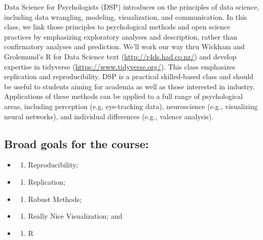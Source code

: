 Data Science for Psychologists (DSP) introduces on the principles of data science, including data wrangling, modeling, visualization, and communication. In this class, we link those principles to psychological methods and open science practices by emphasizing exploratory analyses and description, rather than confirmatory analyses and prediction. We'll work our way thru Wickham and Grolemund's R for Data Science text (\url{http://r4ds.had.co.nz/}) and develop expertise in tidyverse (\url{https://www.tidyverse.org/}). This class emphasizes replication and reproducibility. DSP is a practical skilled-based class and should be useful to students aiming for academia as well as those interested in industry. Applications of these methods can be applied to a full range of psychological areas, including perception (e.g, eye-tracking data), neuroscience (e.g., visualizing neural networks), and individual differences (e.g., valence analysis).

\hypertarget{broad-goals-for-the-course-2}{%
\subsection*{Broad goals for the course:}\label{broad-goals-for-the-course-2}}


\begin{itemize}
\item
  \begin{enumerate}
  \def\labelenumi{\arabic{enumi}.}
  \tightlist
  \item
    Reproducibility;
  \end{enumerate}
\item
  \begin{enumerate}
  \def\labelenumi{\arabic{enumi}.}
  \setcounter{enumi}{1}
  \tightlist
  \item
    Replication;
  \end{enumerate}
\item
  \begin{enumerate}
  \def\labelenumi{\arabic{enumi}.}
  \setcounter{enumi}{2}
  \tightlist
  \item
    Robust Methods;
  \end{enumerate}
\item
  \begin{enumerate}
  \def\labelenumi{\arabic{enumi}.}
  \setcounter{enumi}{3}
  \tightlist
  \item
    Really Nice Visualization; and
  \end{enumerate}
\item
  \begin{enumerate}
  \def\labelenumi{\arabic{enumi}.}
  \setcounter{enumi}{4}
  \tightlist
  \item
    R
  \end{enumerate}
\end{itemize}

